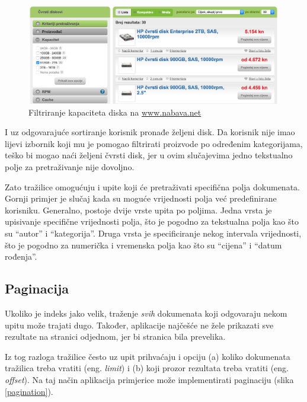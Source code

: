 \documentclass[a4paper,twoside,12pt]{scrreprt}
\begin{document}
\begin{figure}[H]
  \centering
  \includegraphics[width=\textwidth]{nabava3}
  \caption{Filtriranje kapaciteta diska na \url{www.nabava.net}}
  \label{nabava3}
\end{figure}

I uz odgovarajuće sortiranje korisnik pronađe željeni disk. Da korisnik nije imao lijevi izbornik koji mu je pomogao filtrirati proizvode po određenim kategorijama, teško bi mogao naći željeni čvrsti disk, jer u ovim slučajevima jedno tekstualno polje za pretraživanje nije dovoljno.

Zato tražilice omogućuju i upite koji će pretraživati specifična polja dokumenata. Gornji primjer je slučaj kada su moguće vrijednosti polja već predefinirane korisniku. Generalno, postoje dvije vrste upita po poljima. Jedna vrsta je upisivanje specifične vrijednosti polja, što je pogodno za tekstualna polja kao što su ``autor'' i ``kategorija''. Druga vrsta je specificiranje nekog intervala vrijednosti, što je pogodno za numerička i vremenska polja kao što su ``cijena'' i ``datum rođenja''.

\subsection{Paginacija}


Ukoliko je indeks jako velik, traženje \textit{svih} dokumenata koji odgovaraju nekom upitu može trajati dugo. Također, aplikacije najčešće ne žele prikazati sve rezultate na stranici odjednom, jer bi stranica bila prevelika.

Iz tog razloga tražilice često uz upit prihvaćaju i opciju (a) koliko dokumenata tražilica treba vratiti (eng. \textit{limit}) i (b) koji prozor rezultata treba vratiti (eng. \textit{offset}). Na taj način aplikacija primjerice može implementirati paginaciju (slika \ref{pagination}).
\end{document}
